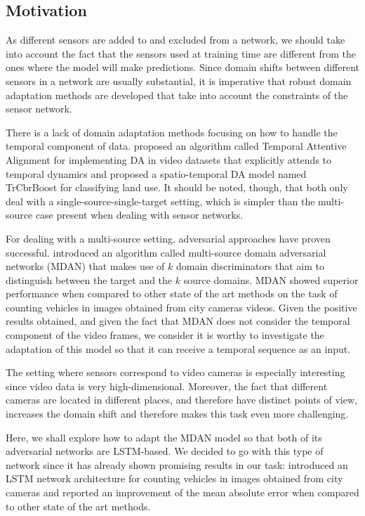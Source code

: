 \subsection{Motivation}
As different sensors are added to and excluded from a network, we should take into account the fact that the sensors used at training time are different from the ones where the model will make predictions. Since domain shifts between different sensors in a network are usually substantial, it is imperative that robust domain adaptation methods are developed that take into account the constraints of the sensor network.

There is a lack of domain adaptation methods focusing on how to handle the temporal component of data. \citet{Chen2019} proposed an algorithm called Temporal Attentive Alignment for implementing DA in video datasets that explicitly attends to temporal dynamics and \citet{Liu2014} proposed a spatio-temporal DA model named TrCbrBoost for classifying land use. It should be noted, though, that both only deal with a single-source-single-target setting, which is simpler than the multi-source case present when dealing with sensor networks.

For dealing with a multi-source setting, adversarial approaches have proven successful. \citet{Zhao2018} introduced an algorithm called multi-source domain adversarial networks (MDAN) that makes use of $k$ domain discriminators that aim to distinguish between the target and the $k$ source domains. MDAN showed superior performance when compared to other state of the art methods on the task of counting vehicles in images obtained from city cameras videos. Given the positive results obtained, and given the fact that MDAN does not consider the temporal component of the video frames, we consider it is worthy to investigate the adaptation of this model so that it can receive a temporal sequence as an input.

The setting where sensors correspond to video cameras is especially interesting since video data is very high-dimensional. Moreover, the fact that different cameras are located in different places, and therefore have distinct points of view, increases the domain shift and therefore makes this task even more challenging.

Here, we shall explore how to adapt the MDAN model so that both of its adversarial networks are LSTM-based. We decided to go with this type of network since it has already shown promising results in our task: \citet{Zhang2017} introduced an LSTM network architecture for counting vehicles in images obtained from city cameras and reported an improvement of the mean absolute error when compared to other state of the art methods.

